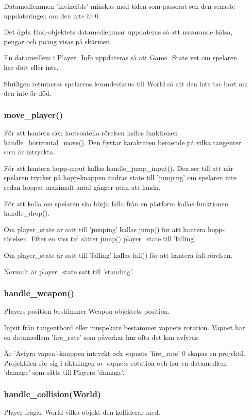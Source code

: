 \documentclass{TDP005mall}
\begin{document}
Datamedlemmen 'invincible' minskas med tiden som passerat sen den senaste uppdateringen om den inte är 0.

Det ägda Hud-objektets datamedlemmar uppdateras så att nuvarande hälsa, pengar och poäng visas på skärmen. 

En datamedlem i Player\_Info uppdateras så att Game\_State vet om spelaren har dött eller inte.

Slutligen returneras spelarens levandestatus till World så att den inte tas bort om den inte är död.

\subsubsection{move\_player()}
För att hantera den horisontella rörelsen kallas funktionen handle\_horizontal\_move().
Den flyttar karaktären beroende på vilka tangenter som är intryckta.

För att hantera hopp-input kallas handle\_jump\_input().
Den ser till att när spelaren trycker på hopp-knappen ändras state till 'jumping' om spelaren inte redan hoppat maximalt antal gånger utan att landa. 

För att kolla om spelaren ska börja falla från en platform kallas funktionen handle\_drop().

Om player\_state är satt till 'jumping' kallas jump() för att hantera hopp-rörelsen.
Efter en viss tid sätter jump() player\_state till 'falling'.

Om player\_state är satt till 'falling' kallas fall() för att hantera fall-rörelsen.

Normalt är player\_state satt till 'standing'. 


\subsubsection{handle\_weapon()}
Players position bestämmer Weapon-objektets position. 

Input från tangentbord eller muspekare bestämmer vapnets rotation.
Vapnet har en datamedlem 'fire\_rate' som påverkar hur ofta det kan avfyras. 

Är 'Avfyra vapen'-knappen intryckt och vapnets 'fire\_rate' 0 skapas en projektil.
Projektilen rör sig i riktningen av vapnets rotation och har en datamedlem 'damage' som sätts till Players 'damage'.

\subsubsection{handle\_collision(World)}
Player frågar World vilka objekt den kolliderar med. 
\end{document}
